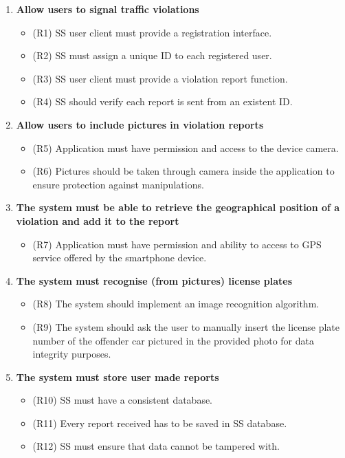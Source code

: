 \begin{enumerate} [label = G\arabic* - ]

\item \textbf{Allow users to signal traffic violations}
	\begin{itemize}
	\item (R1) SS user client must provide a registration interface.
	\item (R2) SS must assign a unique ID to each registered user.
	\item (R3) SS user client must provide a violation report function.
	\item (R4) SS should verify each report is sent from an existent ID.
	\end{itemize}
	\bigskip
	
\item \textbf{Allow users to include pictures in violation reports}
	\begin{itemize}
	\item (R5) Application must have permission and access to the device camera.
	\item (R6) Pictures should be taken through camera inside the application to ensure protection against manipulations.
	\end{itemize}
	\bigskip
	
\item \textbf{The system must be able to retrieve the geographical position of a violation and add it to the report}
	\begin{itemize}
	\item (R7) Application must have permission and ability to access to GPS service offered by the smartphone device.
	\end{itemize}
	\bigskip
	
\item \textbf{The system must recognise (from pictures) license plates}
	\begin{itemize}
	\item (R8) The system should implement an image recognition algorithm.
	\item (R9) The system should ask the user to manually insert the license plate number of the offender car pictured in the provided photo for data integrity purposes.
	\end{itemize}
	\bigskip

\item \textbf{The system must store user made reports}
	\begin{itemize}
	\item (R10) SS must have a consistent database.
	\item (R11) Every report received has to be saved in SS database.
	\item (R12) SS must ensure that data cannot be tampered with.
	\end{itemize}
	\bigskip
	

\end{enumerate}
